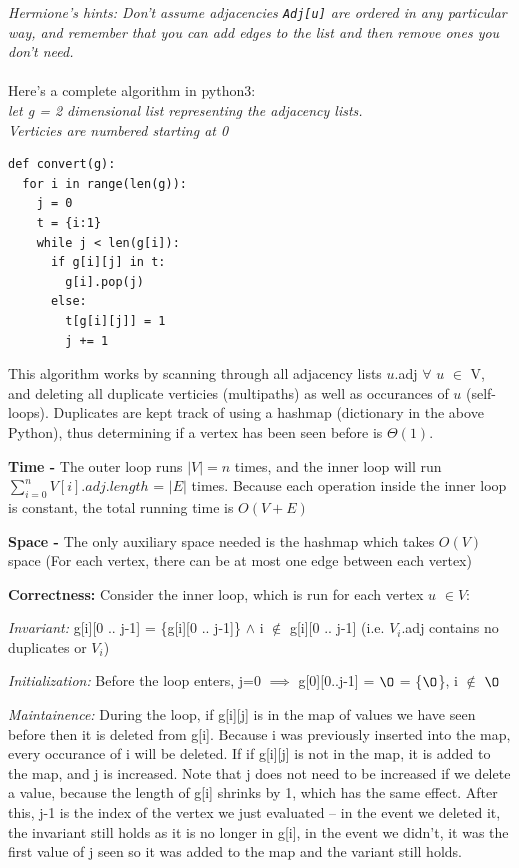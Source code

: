 \documentclass[12pt]{article} \setlength{\oddsidemargin}{0in}
\begin{document}
\textit{Hermione’s hints: Don’t assume adjacencies \texttt{Adj[u]} are
  ordered in any particular way, and remember that you can add edges
  to the list and then remove ones you don't need.}
\\\\
Here's a complete algorithm in python3:\\
\textit{let g = 2 dimensional list representing the adjacency lists.\\ Verticies are numbered starting at 0}\\
\begin{verbatim}
def convert(g):
  for i in range(len(g)):
    j = 0
    t = {i:1}
    while j < len(g[i]):
      if g[i][j] in t:
        g[i].pop(j)
      else: 
        t[g[i][j]] = 1
        j += 1
\end{verbatim}

This algorithm works by scanning through all adjacency lists $u$.adj $\forall$ $u$ $\in$ V, and deleting all duplicate verticies (multipaths) as well as occurances of $u$ (self-loops). Duplicates are kept track of using a hashmap (dictionary in the above Python), thus determining if a vertex has been seen before is $\Theta(1)$. 

\textbf{Time - }The outer loop runs $|V| = n$ times, and the inner loop will run $\sum_{i=0}^{n}{V[i].adj.length}$ = $|E|$ times. Because each operation inside the inner loop is constant, the total running time is $O(V + E)$ 

\textbf{Space - }The only auxiliary space needed is the hashmap which takes $O(V)$ space (For each vertex, there can be at most one edge between each vertex)
\pagebreak

\textbf{Correctness:} Consider the inner loop, which is run for each vertex $u$ $\in V$:

\textit{Invariant: } g[i][0 .. j-1] = \{g[i][0 .. j-1]\} $\wedge$ i $\notin$ g[i][0 .. j-1] (i.e. $V_i$.adj contains no duplicates or $V_i$)

\textit{Initialization: } Before the loop enters, j=0 $\implies$ g[0][0..j-1] = $\O$ = \{$\O$\}, i $\notin$ $\O$

\textit{Maintainence: } During the loop, if g[i][j] is in the map of values we have seen before then it is deleted from g[i]. Because i was previously inserted into the map, every occurance of i will be deleted. If if g[i][j] is not in the map, it is added to the map, and j is increased. Note that j does not need to be increased if we delete a value, because the length of g[i] shrinks by 1, which has the same effect. After this, j-1 is the index of the vertex we just evaluated -- in the event we deleted it, the invariant still holds as it is no longer in g[i], in the event we didn't, it was the first value of j seen so it was added to the map and the variant still holds. 
\end{document}
